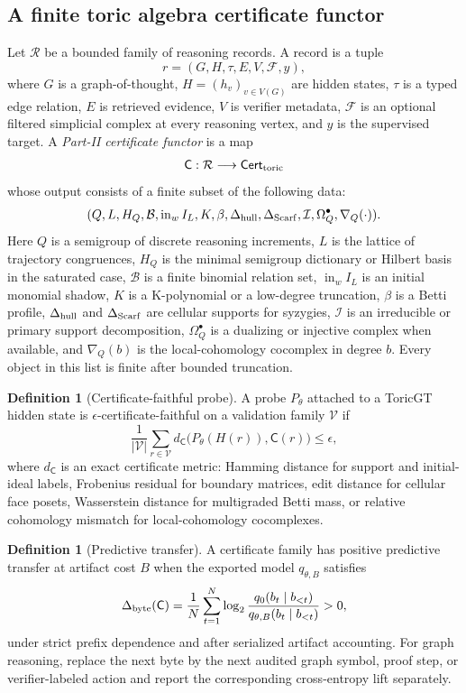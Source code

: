 \documentclass[11pt]{article}
\theoremstyle{definition}
\newtheorem{definition}[theorem]{Definition}
\begin{document}
\subsection{A finite toric algebra certificate functor}
Let \(\mathcal R\) be a bounded family of reasoning records.  A record is a tuple
\[
 r=(G,H,\tau,E,V,\mathcal F, y),
\]
where \(G\) is a graph-of-thought, \(H=(h_v)_{v\in V(G)}\) are hidden states, \(\tau\) is a typed edge relation, \(E\) is retrieved evidence, \(V\) is verifier metadata, \(\mathcal F\) is an optional filtered simplicial complex at every reasoning vertex, and \(y\) is the supervised target.  A \emph{Part-II certificate functor} is a map
\[
  \mathsf C: \mathcal R \longrightarrow \mathsf{Cert}_{\rm toric}
\]
whose output consists of a finite subset of the following data:
\[
(Q,L,H_Q,\mathcal B,\operatorname{in}_w I_L,K,\beta,\Delta_{\rm hull},
\Delta_{\rm Scarf},\mathcal I,\Omega_Q^\bullet,\nabla_Q(\cdot)).
\]
Here \(Q\) is a semigroup of discrete reasoning increments, \(L\) is the lattice of trajectory congruences, \(H_Q\) is the minimal semigroup dictionary or Hilbert basis in the saturated case, \(\mathcal B\) is a finite binomial relation set, \(\operatorname{in}_w I_L\) is an initial monomial shadow, \(K\) is a K-polynomial or a low-degree truncation, \(\beta\) is a Betti profile, \(\Delta_{\rm hull}\) and \(\Delta_{\rm Scarf}\) are cellular supports for syzygies, \(\mathcal I\) is an irreducible or primary support decomposition, \(\Omega_Q^\bullet\) is a dualizing or injective complex when available, and \(\nabla_Q(b)\) is the local-cohomology cocomplex in degree \(b\).  Every object in this list is finite after bounded truncation.

\begin{definition}[Certificate-faithful probe]
A probe \(P_\theta\) attached to a ToricGT hidden state is \(\epsilon\)-certificate-faithful on a validation family \(\mathcal V\) if
\[
  \frac{1}{|\mathcal V|}\sum_{r\in\mathcal V} d_{\mathsf C}\big(P_\theta(H(r)),\mathsf C(r)\big)\leq \epsilon,
\]
where \(d_{\mathsf C}\) is an exact certificate metric: Hamming distance for support and initial-ideal labels, Frobenius residual for boundary matrices, edit distance for cellular face posets, Wasserstein distance for multigraded Betti mass, or relative cohomology mismatch for local-cohomology cocomplexes.
\end{definition}

\begin{definition}[Predictive transfer]
A certificate family has positive predictive transfer at artifact cost \(B\) when the exported model \(q_{\theta,B}\) satisfies
\[
  \Delta_{\rm byte}(\mathsf C)=\frac1N\sum_{t=1}^N
  \log_2\frac{q_{0}(b_t\mid b_{<t})}{q_{\theta,B}(b_t\mid b_{<t})}>0,
\]
under strict prefix dependence and after serialized artifact accounting.  For graph reasoning, replace the next byte by the next audited graph symbol, proof step, or verifier-labeled action and report the corresponding cross-entropy lift separately.
\end{definition}
\end{document}
